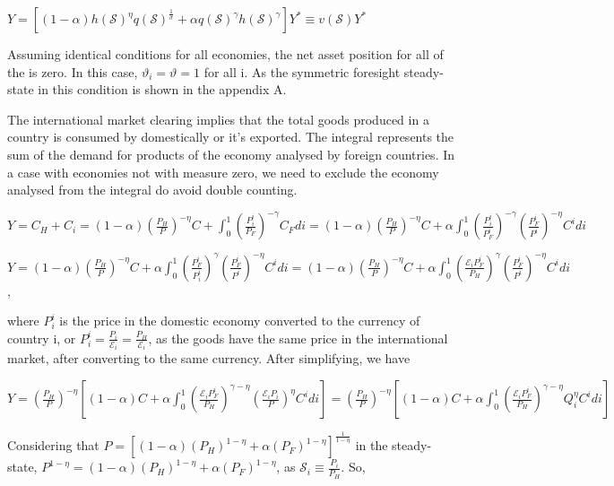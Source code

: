 \documentclass[
]{article}
\begin{document}
\(\displaystyle Y = \left[ (1-\alpha)h(\mathcal{S})^{\eta} q(\mathcal{S})^\frac{1}{\sigma} + \alpha q(\mathcal{S})^{\gamma} h(\mathcal{S})^{\gamma} \right]Y^* \equiv v (\mathcal{S})Y^*\)

\vspace{8pt}

Assuming identical conditions for all economies, the net asset position
for all of the is zero. In this case, \(\vartheta_i = \vartheta = 1\)
for all i. As the symmetric foresight steady-state in this condition is
shown in the appendix A.

The international market clearing implies that the total goods produced
in a country is consumed by domestically or it's exported. The integral
represents the sum of the demand for products of the economy analysed by
foreign countries. In a case with economies not with measure zero, we
need to exclude the economy analysed from the integral do avoid double
counting.

\(\displaystyle Y=C_H+C_i=(1-\alpha)\left( \frac{P_{H}}{P} \right)^{-\eta}C + \int_0^1 \left( \frac{P_i^i}{P_F} \right)^{-\gamma}C_F di = (1-\alpha)\left( \frac{P_{H}}{P} \right)^{-\eta}C + \alpha \int_0^1 \left( \frac{P_i^i}{P_F^i} \right)^{-\gamma} \left( \frac{P_{F}^i}{P^i} \right)^{-\eta}C^idi\)

\(\displaystyle Y= (1-\alpha)\left( \frac{P_{H}}{P} \right)^{-\eta}C + \alpha \int_0^1 \left( \frac{P_F^i}{P_i^i} \right)^{\gamma} \left( \frac{P_{F}^i}{P^i} \right)^{-\eta}C^idi= (1-\alpha)\left( \frac{P_{H}}{P} \right)^{-\eta}C + \alpha \int_0^1 \left( \frac{\mathcal{E}_i P_F^i }{P_H} \right)^{\gamma} \left( \frac{P_{F}^i}{P^i} \right)^{-\eta}C^idi\),

where \(P_i^i\) is the price in the domestic economy converted to the
currency of country i, or
\(\displaystyle P_i^i = \frac{P_i}{\mathcal{E}_i} = \frac{P_H}{\mathcal{E}_i}\),
as the goods have the same price in the international market, after
converting to the same currency. After simplifying, we have

\(\displaystyle Y = \left( \frac{P_{H}}{P} \right)^{-\eta} \left[ (1-\alpha)C + \alpha \int_0^1 \left( \frac{ \mathcal{E}_i P_F^i }{P_H} \right)^{\gamma-\eta} \left( \frac{\mathcal{E}_i P_i}{P} \right)^\eta C^idi \right] = \left( \frac{P_{H}}{P} \right)^{-\eta} \left[ (1-\alpha)C + \alpha \int_0^1 \left( \frac{ \mathcal{E}_i P_F^i }{P_H} \right)^{\gamma-\eta} Q_i^\eta C^idi \right]\)

Considering that
\(\displaystyle P = \left[ (1-\alpha) \left( P_H \right)^{1-\eta} + \alpha \left( P_F\right)^{1-\eta} \right]^{\frac{1}{1-\eta}}\)
in the steady-state,
\(\displaystyle P^{1-\eta} = (1-\alpha) \left( P_H \right)^{1-\eta} + \alpha \left( P_F \right)^{1-\eta}\),
as \(\displaystyle \mathcal{S}_i \equiv \frac{P_i}{P_H}\). So,
\end{document}
